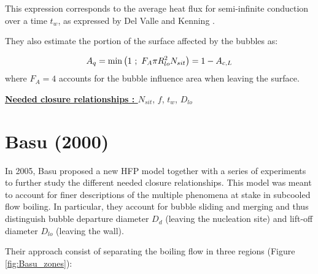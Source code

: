 This expression corresponds to the average heat flux for semi-infinite conduction over a time $t_{w}$, as expressed by Del Valle and Kenning \cite{delValle}.

They also estimate the portion of the surface affected by the bubbles as:

\begin{align}
A_{q}=\mathrm{min}\left( 1\ ;\ F_{A}\pi R_{lo}^{2} N_{sit} \right)=1-A_{c,L}
\label{eq:HFP_KP_AQ}
\end{align}
where $F_{A}=4$ accounts for the bubble influence area when leaving the surface.

\npar

\textbf{\underline{Needed closure relationships : }} $N_{sit}$, $f$, $t_{w}$, $D_{lo}$ 


\section{Basu (2000)}

In 2005, Basu \etal \cite{basu2005, basu2005a} proposed a new HFP model together with a series of experiments to further study the different needed closure relationships. This model was meant to account for finer descriptions of the multiple phenomena at stake in subcooled flow boiling. In particular, they account for bubble sliding and merging and thus distinguish bubble departure diameter $D_{d}$ (leaving the nucleation site) and lift-off diameter $D_{lo}$ (leaving the wall).

Their approach consist of separating the boiling flow in three regions (Figure \ref{fig:Basu_zones}):

